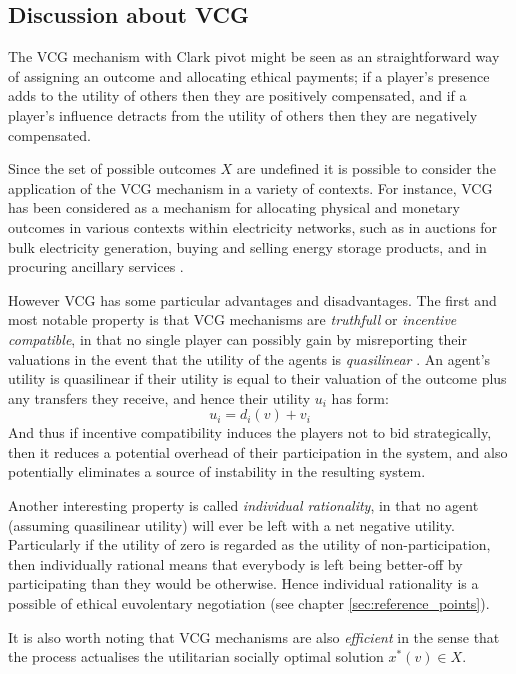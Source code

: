 \subsection{Discussion about VCG}
The VCG mechanism with Clark pivot might be seen as an straightforward way of assigning an outcome and allocating ethical payments; if a player's presence adds to the utility of others then they are positively compensated, and if a player's influence detracts from the utility of others then they are negatively compensated.

Since the set of possible outcomes $X$ are undefined it is possible to consider the application of the VCG mechanism in a variety of contexts.	
For instance, VCG has been considered as a mechanism for allocating physical and monetary outcomes in various contexts within electricity networks, such as in auctions for bulk electricity generation, buying and selling energy storage products, and in procuring ancillary services \cite{FABRA200272, SESSA2017189, 8264596, 7512339}.

However VCG has some particular advantages and disadvantages.
The first and most notable property is that VCG mechanisms are \textit{truthfull} or \textit{incentive compatible}, in that no single player can possibly gain by misreporting their valuations in the event that the utility of the agents is \textit{quasilinear} \cite{roberts1979characterization, Lavi2008}.
An agent's utility is quasilinear if their utility is equal to their valuation of the outcome plus any transfers they receive, and hence their utility $u_i$ has form:
$$ u_i = d_i(v)+v_i $$
And thus if incentive compatibility induces the players not to bid strategically, then it reduces a potential overhead of their participation in the system, and also potentially eliminates a source of instability in the resulting system.

Another interesting property is called \textit{individual rationality}, in that no agent (assuming quasilinear utility) will ever be left with a net negative utility. Particularly if the utility of zero is regarded as the utility of non-participation, then individually rational means that everybody is left being better-off by participating than they would be otherwise. Hence individual rationality is a possible of ethical euvolentary negotiation (see chapter \ref{sec:reference_points}).

It is also worth noting that VCG mechanisms are also \textit{efficient} in the sense that the process actualises the utilitarian socially optimal solution $x^*(v) \in X$.

